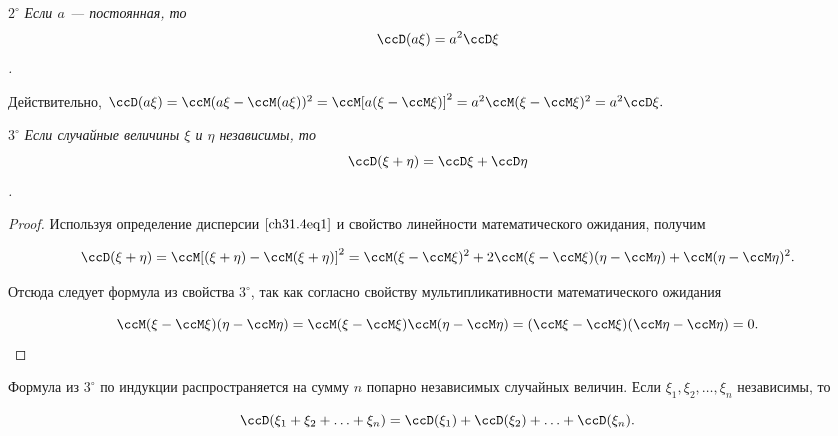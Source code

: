 $2^{\circ}$ \textit{Если $a$ --- постоянная, то $$\ccD(a\xi) = a^2 \ccD\xi$$.}

Действительно, $\ccD(a\xi) = \ccM(a\xi - \ccM (a\xi))^2 = \ccM [a (\xi - \ccM \xi)]^2 = a^2\ccM(\xi - \ccM\xi)^2 = a^2 \ccD\xi.$

$3^{\circ}$ \textit{Если случайные величины $\xi$ и $\eta$ независимы, то $$\ccD(\xi + \eta) = \ccD\xi + \ccD\eta$$.}

\begin{proof}
Используя определение дисперсии $\eqref{ch31.4eq1}$ и свойство линейности математического ожидания, получим

$$
\ccD(\xi + \eta) = \ccM[(\xi + \eta) - \ccM(\xi + \eta)]^2 = \ccM(\xi - \ccM\xi)^2 + 2\ccM(\xi - \ccM\xi)(\eta - \ccM\eta) + \ccM(\eta  - \ccM\eta)^2.
$$

Отсюда следует формула из свойства $3^{\circ}$, так как согласно свойству мультипликативности математического ожидания

$$
\ccM(\xi - \ccM\xi)(\eta - \ccM\eta) = \ccM(\xi - \ccM\xi)\ccM(\eta - \ccM\eta) = (\ccM\xi - \ccM\xi)(\ccM\eta - \ccM\eta) = 0.
$$


\end{proof}

Формула из $3^{\circ}$ по индукции распространяется на сумму $n$ попарно независимых случайных величин. Если $\xi_1,\xi_2, \ldots, \xi_n$ независимы, то 

$$
\ccD(\xi_1 + \xi_2 + \ldots + \xi_n) = \ccD(\xi_1) + \ccD(\xi_2) + \ldots + \ccD(\xi_n).
$$